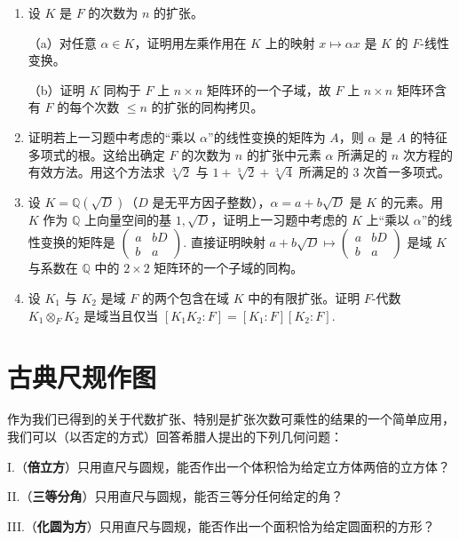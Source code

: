\begin{enumerate}
\item 设 \(K\) 是 \(F\) 的次数为 \(n\) 的扩张。

（a）对任意 \(\alpha \in K\)，证明用左乘作用在 \(K\) 上的映射 \(x \mapsto \alpha x\) 是 \(K\) 的 \(F\)-线性变换。

（b）证明 \(K\) 同构于 \(F\) 上 \(n \times n\) 矩阵环的一个子域，故 \(F\) 上 \(n \times n\) 矩阵环含有 \(F\) 的每个次数 \(\leq n\) 的扩张的同构拷贝。

\item 证明若上一习题中考虑的“乘以 \(\alpha\)”的线性变换的矩阵为 \(A\)，则 \(\alpha\) 是 \(A\) 的特征多项式的根。这给出确定 \(F\) 的次数为 \(n\) 的扩张中元素 \(\alpha\) 所满足的 \(n\) 次方程的有效方法。用这个方法求 \(\sqrt[3]{2}\) 与 \(1+\sqrt[3]{2}+\sqrt[3]{4}\) 所满足的 3 次首一多项式。

\item 设 \(K = \mathbb{Q}(\sqrt{D})\)（\(D\) 是无平方因子整数），\(\alpha = a+b\sqrt{D}\) 是 \(K\) 的元素。用 \(K\) 作为 \(\mathbb{Q}\) 上向量空间的基 \(1, \sqrt{D}\)，证明上一习题中考虑的 \(K\) 上“乘以 \(\alpha\)”的线性变换的矩阵是 \(\begin{pmatrix} a & bD \\ b & a \end{pmatrix}\). 直接证明映射 \(a+b\sqrt{D} \mapsto \begin{pmatrix} a & bD \\ b & a \end{pmatrix}\) 是域 \(K\) 与系数在 \(\mathbb{Q}\) 中的 \(2 \times 2\) 矩阵环的一个子域的同构。

\item 设 \(K_1\) 与 \(K_2\) 是域 \(F\) 的两个包含在域 \(K\) 中的有限扩张。证明 \(F\)-代数 \(K_1 \otimes_F K_2\) 是域当且仅当 \([K_1K_2:F] = [K_1:F][K_2:F]\).
\end{enumerate}

\section{古典尺规作图}

作为我们已得到的关于代数扩张、特别是扩张次数可乘性的结果的一个简单应用，我们可以（以否定的方式）回答希腊人提出的下列几何问题：

I.（\textbf{倍立方}）只用直尺与圆规，能否作出一个体积恰为给定立方体两倍的立方体？

II.（\textbf{三等分角}）只用直尺与圆规，能否三等分任何给定的角？

III.（\textbf{化圆为方}）只用直尺与圆规，能否作出一个面积恰为给定圆面积的方形？

